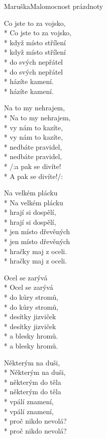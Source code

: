 \documentclass[10.5pt]{book}
\begin{document}
\begin{poem}{Maruška}{Malomocnost prázdnoty}
\begin{altverse}
Co jste to za vojsko,\\*
Co jste to za vojsko,\\*
když místo střílení\\*
když místo střílení\\*
do svých nepřátel\\*
do svých nepřátel\\*
házíte kamení.\\*
házíte kamení.
\end{altverse}

\begin{altverse}
Na to my nehrajem,\\*
Na to my nehrajem,\\*
vy nám to kazíte,\\*
vy nám to kazíte,\\*
nedbáte pravidel,\\*
nedbáte pravidel,\\*
/:a pak se divíte!\\*
A pak se divíte!/:
\end{altverse}

\begin{altverse}
Na velkém plácku\\*
Na velkém plácku\\*
hrají si dospělí,\\*
hrají si dospělí,\\*
jen místo dřevěných\\*
jen místo dřevěných\\*
hračky maj z oceli.\\*
hračky maj z oceli.
\end{altverse}

\begin{altverse}
Ocel se zarývá\\*
Ocel se zarývá\\*
do kůry stromů,\\*
do kůry stromů,\\*
desítky jizviček\\*
desítky jizviček\\*
a blesky hromů.\\*
a blesky hromů.
\end{altverse}

\begin{altverse}
Některým na duši,\\*
Některým na duši,\\*
některým do těla\\*
některým do těla\\*
vpálí znamení,\\*
vpálí znamení,\\*
proč nikdo nevolá?\\*
proč nikdo nevolá?
\end{altverse}


\end{poem}
\end{document}
